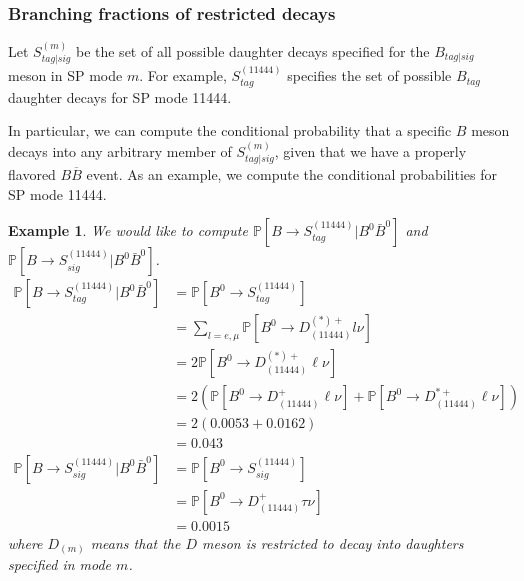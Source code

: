 \documentclass{article}
\newcommand{\Prob}[1]{\ensuremath{\mathbb{P}\left[#1\right]}}
\newcommand{\CondP}[2]{\ensuremath{\mathbb{P}\left[#1|#2\right]}}
\renewcommand{\(}{\left(}
\renewcommand{\)}{\right)}
\newtheorem{example}[theorem]{Example}
\numberwithin{equation}{section}
\begin{document}
\subsubsection{Branching fractions of restricted decays}
Let $S^{(m)}_{tag|sig}$ be the set of all possible daughter decays specified for the $B_{tag|sig}$ meson in SP mode $m$. For example, $S^{(11444)}_{tag}$ specifies the set of possible $B_{tag}$ daughter decays for SP mode 11444. 

In particular, we can compute the conditional probability that a specific $B$ meson decays into any arbitrary member of $S^{(m)}_{tag|sig}$, given that we have a properly flavored $B\overline{B}$ event. As an example, we compute the conditional probabilities for SP mode 11444. 

\begin{example}
  We would like to compute $\CondP{B\rightarrow S^{(11444)}_{tag} }{B^0\bar{B}^0}$ and $\CondP{B\rightarrow S^{(11444)}_{sig} }{B^0\bar{B}^0}$.
  \begin{align}
    \CondP{B\rightarrow S^{(11444)}_{tag} }{B^0\bar{B}^0} 
    &= \Prob{B^0\rightarrow S^{(11444)}_{tag}} \\
    &= \sum_{l=e,\mu}\Prob{B^0\rightarrow D^{(*)+}_{(11444)} l \nu} \\
    &= 2 \Prob{B^0\rightarrow D^{(*)+}_{(11444)}\ell\nu} \\
    &= 2 \(\Prob{B^0\rightarrow D^{+}_{(11444)}\ell\nu} + \Prob{B^0\rightarrow D^{*+}_{(11444)}\ell\nu}\) \\
    &= 2 (0.0053 + 0.0162) \\
    &= 0.043 \\
    \CondP{B\rightarrow S^{(11444)}_{sig} }{B^0\bar{B}^0} 
    &= \Prob{B^0\rightarrow S^{(11444)}_{sig}} \\
    &= \Prob{B^0\rightarrow D^{+}_{(11444)}\tau\nu} \\
    &= 0.0015
  \end{align}
  where $D_{(m)}$ means that the $D$ meson is restricted to decay into daughters specified in mode $m$.  
\end{example}
\end{document}

